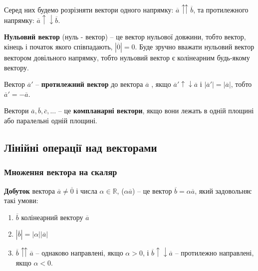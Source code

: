 Серед них будемо розрізняти вектори одного напрямку: $\overline{a} \upuparrows \overline{b}$, та протилежного напрямку: $\overline{a} \uparrow \downarrow \overline{b}$.

\begin{definition}
    \textbf{Нульовий вектор} (нуль - вектор) – це вектор нульової довжини, тобто вектор, кінець і початок якого співпадають, $|\overline{0}| = 0$. Буде зручно вважати нульовий вектор вектором довільного напрямку, тобто нульовий вектор є колінеарним будь-якому вектору.
\end{definition}

\begin{definition}
    Вектор $\overline{a}'$ -- \textbf{протилежний вектор} до вектора $\overline{a}$ , якщо $\overline{a}' \uparrow \downarrow \overline{a}$ і $|\overline{a}'| = |\overline{a}|$, тобто $\overline{a}' = -\overline{a}$.
\end{definition}

\begin{definition}
	Вектори $\overline{a}, \overline{b}, \overline{c}, ...$ -- це \textbf{компланарні вектори}, якщо вони лежать в одній площині або паралельні одній площині.
\end{definition}

\subsection{Лінійні операції над векторами}

\subsubsection*{Множення вектора на скаляр}

\begin{definition}
	\textbf{Добуток} вектора $\overline{a} \neq \overline{0}$  і числа $\alpha \in \mathbb{R}$, ($\alpha \overline{a}$) -- це вектор $\overline{b} = \alpha \overline{a}$, який задовольняє такі умови:
		\begin{enumerate}[label=\arabic*)]
			\item $\overline{b}$ колінеарний вектору $\overline{a}$
			\item $|\overline{b}| = |\alpha| |\overline{a}|$
			\item $\overline{b} \upuparrows \overline{a}$ -- однаково направлені, якщо $\alpha > 0$, і $\overline{b} \uparrow \downarrow \overline{a}$ – протилежно направлені, якщо $\alpha < 0$.
		\end{enumerate}
\end{definition}

